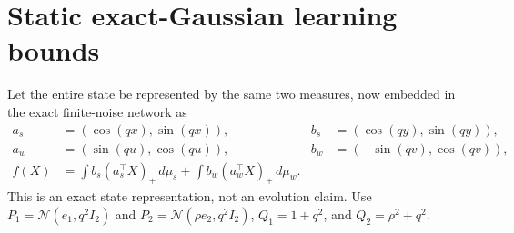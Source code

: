 \documentclass[11pt]{article}
\numberwithin{equation}{section}
\theoremstyle{remark}\newtheorem{remark}[theorem]{Remark}
\newcommand{\1}{\mathbf 1}
\begin{document}
\section{Static exact-Gaussian learning bounds}
\label{inc:AN06:v1:staticlearning}
Let the entire state be represented by the same two measures, now embedded
in the exact finite-noise network as
\begin{align*}
 a_s&=(\cos(qx),\sin(qx)),& b_s&=(\cos(qy),\sin(qy)),\\
 a_w&=(\sin(qu),\cos(qu)),& b_w&=(-\sin(qv),\cos(qv)),\\
 f(X)&=\int b_s(a_s^\top X)_+\,d\mu_s
       +\int b_w(a_w^\top X)_+\,d\mu_w.
\end{align*}
This is an exact state representation, not an evolution claim.
Use $P_1=\mathcal N(e_1,q^2I_2)$ and
$P_2=\mathcal N(\rho e_2,q^2I_2)$,
$Q_1=1+q^2$, and $Q_2=\rho^2+q^2$.
\end{document}

